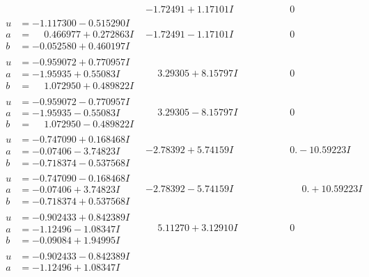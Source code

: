 \documentclass[1p]{elsarticle_modified}
\theoremstyle{definition}
\begin{document}
$$\begin{array}{c|c|c}
 & -1.72491 + 1.17101 I & \phantom{-0.000000 } 0 \\ \hline\begin{aligned}
u &= -1.117300 - 0.515290 I \\
a &= \phantom{-}0.466977 + 0.272863 I \\
b &= -0.052580 + 0.460197 I\end{aligned}
 & -1.72491 - 1.17101 I & \phantom{-0.000000 } 0 \\ \hline\begin{aligned}
u &= -0.959072 + 0.770957 I \\
a &= -1.95935 + 0.55083 I \\
b &= \phantom{-}1.072950 + 0.489822 I\end{aligned}
 & \phantom{-}3.29305 + 8.15797 I & \phantom{-0.000000 } 0 \\ \hline\begin{aligned}
u &= -0.959072 - 0.770957 I \\
a &= -1.95935 - 0.55083 I \\
b &= \phantom{-}1.072950 - 0.489822 I\end{aligned}
 & \phantom{-}3.29305 - 8.15797 I & \phantom{-0.000000 } 0 \\ \hline\begin{aligned}
u &= -0.747090 + 0.168468 I \\
a &= -0.07406 - 3.74823 I \\
b &= -0.718374 - 0.537568 I\end{aligned}
 & -2.78392 + 5.74159 I & \phantom{-0.000000 } 0. - 10.59223 I \\ \hline\begin{aligned}
u &= -0.747090 - 0.168468 I \\
a &= -0.07406 + 3.74823 I \\
b &= -0.718374 + 0.537568 I\end{aligned}
 & -2.78392 - 5.74159 I & \phantom{-0.000000 -}0. + 10.59223 I \\ \hline\begin{aligned}
u &= -0.902433 + 0.842389 I \\
a &= -1.12496 - 1.08347 I \\
b &= -0.09084 + 1.94995 I\end{aligned}
 & \phantom{-}5.11270 + 3.12910 I & \phantom{-0.000000 } 0 \\ \hline\begin{aligned}
u &= -0.902433 - 0.842389 I \\
a &= -1.12496 + 1.08347 I \\

\end{aligned}
\end{array}$$
\end{document}
